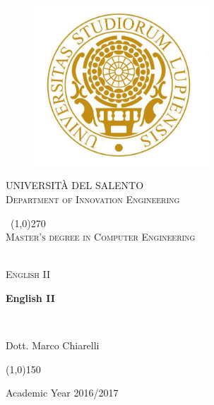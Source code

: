 \documentclass[11 pt,a4paper,twoside,openany]{book}
\begin{document}
\pagestyle{fancy}
\fancyhead{}
\fancyfoot{}
\fancyfoot[R]{\thepage}
\renewcommand{\headrulewidth}{0pt}
\renewcommand{\footrulewidth}{0.1pt}

\newpage	
\begin{titlepage}
\begin{center}
	
\begin{figure}
	\centering
	\includegraphics[height=6cm]{unigold.jpg}
\end{figure}		

\begin{center}
\begin{LARGE}
	\textsc{UNIVERSIT\`A DEL SALENTO}\\
	[0.2cm]
	\textsc{Department of Innovation Engineering}
\end{LARGE}
\end{center}	
	
	\
	\line(1,0){270} \\
	[0.25cm]
	
	\textsc{Master's degree in Computer Engineering}\
	
	\textsl{}\\
	[1cm]
	\textsc{English II}\
	
	\bigskip 
	\huge{\bfseries English II}\

	
	\bigskip
	\textsl{}\\
	[2cm]
	


\begin{LARGE}
	
	Dott. Marco Chiarelli
	
\end{LARGE}

\vspace{5cm}
	
\line(1,0){150} \\
\begin{small}
	Academic Year 2016/2017 \\
\end{small}
\end{center}
\end{titlepage}
\end{document}
